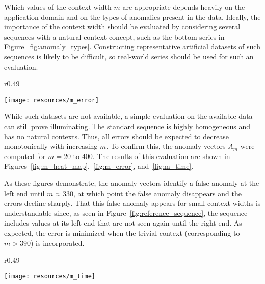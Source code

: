 Which values of the context width $m$ are appropriate depends heavily on the application domain and on the types of anomalies present in the data. Ideally, the importance of the context width should be evaluated by considering several sequences with a natural context concept, such as the bottom series in Figure~\ref{fig:anomaly_types}. Constructing representative artificial datasets of such sequences is likely to be difficult, so real-world series should be used for such an evaluation.

\begin{wrapfigure}{r}{0.49\textwidth} \vspace{-20pt}
    \vspace{-10pt}
    \begin{center}
        \texttt{[image: resources/m\_error]}
    \end{center}
    \vspace{-20pt}
    \caption{\small{Errors of the anomaly vectors $A_m$.}}
    \vspace{-20pt}
\label{fig:m_error}
\end{wrapfigure}

While such datasets are not available, a simple evaluation on the available data can still prove illuminating. The standard sequence is highly homogeneous and has no natural contexts. Thus, all errors should be expected to decrease monotonically with increasing $m$. To confirm this, the anomaly vectors $A_m$ were computed for $m = 20$ to $400$. The results of this evaluation are shown in Figures~\ref{fig:m_heat_map},~\ref{fig:m_error}, and~\ref{fig:m_time}.

As these figures demonstrate, the anomaly vectors identify a false anomaly at the left end until $m \approx 330$, at which point the false anomaly disappears and the errors decline sharply. That this false anomaly appears for small context widths is understandable since, as seen in Figure~\ref{fig:reference_sequence}, the sequence includes values at its left end that are not seen again until the right end. As expected, the error is minimized when the trivial context (corresponding to $m > 390$) is incorporated.

\begin{wrapfigure}{r}{0.49\textwidth}
    \vspace{-30pt}
    \begin{center}
        \texttt{[image: resources/m\_time]}
    \end{center}
    \vspace{-20pt}
    \caption{\small{Evaluation times of the anomaly vectors $A_m$.}}
    \vspace{-20pt}
\label{fig:m_time}
\end{wrapfigure}

